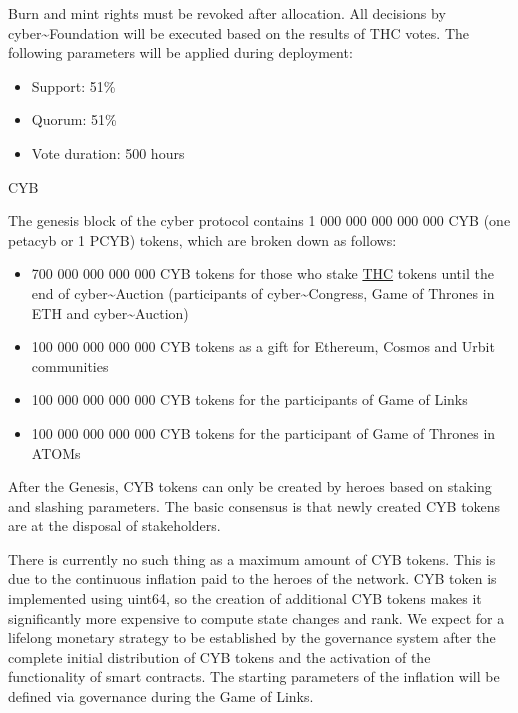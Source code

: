 \documentclass[8pt,oneside]{amsart}
\makeatletter
\renewcommand\subsection{\@startsection{subsection}
                                    {2}{\z@}
                                    {-3.25ex\@plus -1ex \@minus -.2ex}
                                    {0ex \@plus .2ex}
                                    {\play\Large}
                        }
\newcommand{\titleSection}[1]{\subsection{#1}}
\newenvironment{Figure}
  {\par\medskip\noindent\minipage{\linewidth}}
  {\endminipage\par\medskip}
\makeatother
\begin{document}
\begin{Figure}
 \centering
 
\end{Figure}

Burn and mint rights must be revoked after allocation. All decisions by cyber\~{}Foundation will be executed based on the results of THC votes. The following parameters will be applied during deployment:

\begin{itemize}
\item Support: 51\%
\item Quorum: 51\%
\item Vote duration: 500 hours
\end{itemize}

\titleSection{CYB}\label{cyb}

The genesis block of the cyber protocol contains 1 000 000 000 000 000 CYB (one petacyb or 1 PCYB) tokens, which are broken down as follows:

\begin{itemize}
\item 700 000 000 000 000 CYB tokens for those who stake {\hyperref[thc]{THC}} tokens until the end of cyber\~{}Auction (participants of cyber\~{}Congress, Game of Thrones in ETH and cyber\~{}Auction)
\item 100 000 000 000 000 CYB tokens as a gift for Ethereum, Cosmos and Urbit communities
\item 100 000 000 000 000 CYB tokens for the participants of Game of Links
\item 100 000 000 000 000 CYB tokens for the participant of Game of Thrones in ATOMs
\end{itemize}

\begin{Figure}
 \centering
 
\end{Figure}

After the Genesis, CYB tokens can only be created by heroes based on staking and slashing parameters. The basic consensus is that newly created CYB tokens are at the disposal of stakeholders.

There is currently no such thing as a maximum amount of CYB tokens. This is due to the continuous inflation paid to the heroes of the network. CYB token is implemented using uint64, so the creation of additional CYB tokens makes it significantly more expensive to compute state changes and rank. We expect for a lifelong monetary strategy to be established by the governance system after the complete initial distribution of CYB tokens and the activation of the functionality of smart contracts. The starting parameters of the inflation will be defined via governance during the Game of Links.
\end{document}

